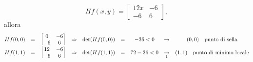 \begin{example}
	\begin{equation*}
		Hf(x,y) =
		\begin{bmatrix}
			12x & -6\\
			-6 & 6
		\end{bmatrix},
	\end{equation*}
	allora
	\begin{equation*}
		\begin{matrix}
			Hf(0,0) &=& 
			\begin{bmatrix}
				0 & -6\\
				-6 & 6
			\end{bmatrix}&\Rightarrow&\det(Hf(0,0)) &=& -36 < 0 &\rightarrow& (0,0)\quad \text{punto di sella}\\
			Hf(1,1) &=& 
			\begin{bmatrix}
				12 & -6\\
				-6 & 6
			\end{bmatrix}&\Rightarrow&\det(Hf(1,1)) &=& 72 - 36 < 0 &\underset{\footnotemark}{\rightarrow}& (1,1)\quad \text{punto di minimo locale}
		\end{matrix}
	\end{equation*}
\end{example}

